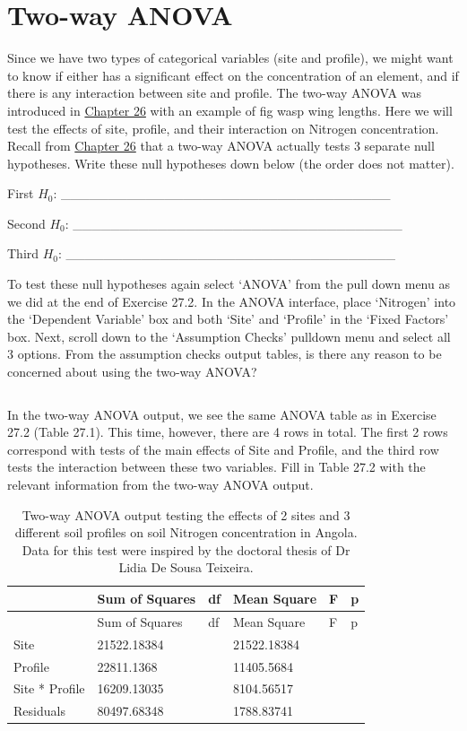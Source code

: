 \documentclass[
]{scrbook}
\begin{document}
\hypertarget{two-way-anova}{%
\section{Two-way ANOVA}\label{two-way-anova}}

Since we have two types of categorical variables (site and profile), we might want to know if either has a significant effect on the concentration of an element, and if there is any interaction between site and profile.
The two-way ANOVA was introduced in \protect\hyperlink{Chapter_26}{Chapter 26} with an example of fig wasp wing lengths.
Here we will test the effects of site, profile, and their interaction on Nitrogen concentration.
Recall from \protect\hyperlink{Chapter_26}{Chapter 26} that a two-way ANOVA actually tests 3 separate null hypotheses.
Write these null hypotheses down below (the order does not matter).

First \(H_{0}\): \_\_\_\_\_\_\_\_\_\_\_\_\_\_\_\_\_\_\_\_\_\_\_\_\_\_\_\_\_\_\_\_\_\_\_

Second \(H_{0}\): \_\_\_\_\_\_\_\_\_\_\_\_\_\_\_\_\_\_\_\_\_\_\_\_\_\_\_\_\_\_\_\_\_\_\_

Third \(H_{0}\): \_\_\_\_\_\_\_\_\_\_\_\_\_\_\_\_\_\_\_\_\_\_\_\_\_\_\_\_\_\_\_\_\_\_\_

To test these null hypotheses again select `ANOVA' from the pull down menu as we did at the end of Exercise 27.2.
In the ANOVA interface, place `Nitrogen' into the `Dependent Variable' box and both `Site' and `Profile' in the `Fixed Factors' box.
Next, scroll down to the `Assumption Checks' pulldown menu and select all 3 options.
From the assumption checks output tables, is there any reason to be concerned about using the two-way ANOVA?

\begin{verbatim}
\end{verbatim}

In the two-way ANOVA output, we see the same ANOVA table as in Exercise 27.2 (Table 27.1).
This time, however, there are 4 rows in total.
The first 2 rows correspond with tests of the main effects of Site and Profile, and the third row tests the interaction between these two variables.
Fill in Table 27.2 with the relevant information from the two-way ANOVA output.

\begin{longtable}[]{@{}llllll@{}}
\caption{\label{tab:unnamed-chunk-132}Two-way ANOVA output testing the effects of 2 sites and 3 different soil profiles on soil Nitrogen concentration in Angola. Data for this test were inspired by the doctoral thesis of Dr Lidia De Sousa Teixeira.}\tabularnewline
\toprule
& Sum of Squares & df & Mean Square & F & p \\
\midrule
\endfirsthead
\toprule
& Sum of Squares & df & Mean Square & F & p \\
\midrule
\endhead
Site & 21522.18384 & & 21522.18384 & & \\
Profile & 22811.1368 & & 11405.5684 & & \\
Site * Profile & 16209.13035 & & 8104.56517 & & \\
Residuals & 80497.68348 & & 1788.83741 & & \\
\bottomrule
\end{longtable}
\end{document}
